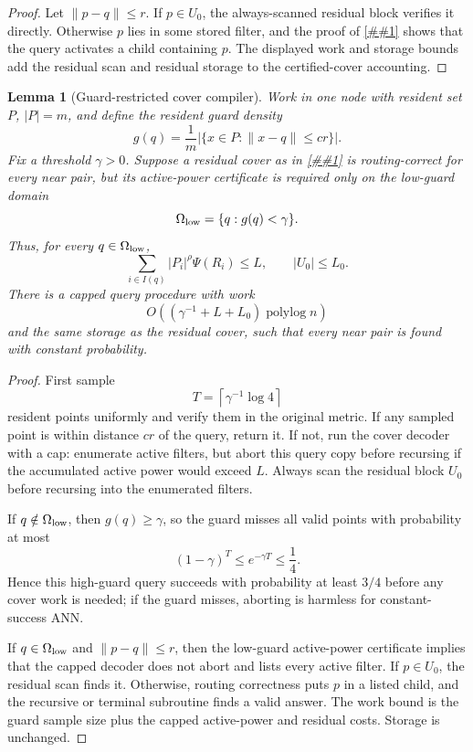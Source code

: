 \documentclass[10pt]{article}
\newcommand{\cref}[1]{\ref{##1}}
\newtheorem{lemma}[theorem]{Lemma}
\theoremstyle{definition}
\newcommand{\polylog}{\operatorname{polylog}}
\begin{document}
\begin{proof}
   Let $\|p-q\|\le r$.  If $p\in U_0$, the always-scanned residual block
   verifies it directly.  Otherwise $p$ lies in some stored filter, and the
   proof of \cref{lem:certified-cover-compiler} shows that the query activates
   a child containing $p$.  The displayed work and storage bounds add the
   residual scan and residual storage to the certified-cover accounting.
\end{proof}

\begin{lemma}[Guard-restricted cover compiler]\label{lem:guard-restricted-cover}
   Work in one node with resident set $P$, $|P|=m$, and define the resident
   guard density
   \[
      g(q)=\frac1m\bigl|\{x\in P:\|x-q\|\le cr\}\bigr|.
   \]
   Fix a threshold $\gamma>0$.  Suppose a residual cover as in
   \cref{lem:cover-residual-scan} is routing-correct for every near pair, but
   its active-power certificate is required only on the low-guard domain
   \[
      \Omega_{\rm low}=\{q:g(q)<\gamma\}.
   \]
   Thus, for every $q\in\Omega_{\rm low}$,
   \[
      \sum_{i\in I(q)} |P_i|^\rho\Psi(R_i)\le L,
      \qquad |U_0|\le L_0 .
   \]
   There is a capped query procedure with work
   \[
      O((\gamma^{-1}+L+L_0)\polylog n)
   \]
   and the same storage as the residual cover, such that every near pair is
   found with constant probability.
\end{lemma}

\begin{proof}
   First sample
   \[
      T=\left\lceil \gamma^{-1}\log 4\right\rceil
   \]
   resident points uniformly and verify them in the original metric.  If any
   sampled point is within distance $cr$ of the query, return it.  If not, run
   the cover decoder with a cap: enumerate active filters, but abort this query
   copy before recursing if the accumulated active power would exceed $L$.
   Always scan the residual block $U_0$ before recursing into the enumerated
   filters.

   If $q\notin\Omega_{\rm low}$, then $g(q)\ge\gamma$, so the guard misses all
   valid points with probability at most
   \[
      (1-\gamma)^T\le e^{-\gamma T}\le\frac14 .
   \]
   Hence this high-guard query succeeds with probability at least $3/4$ before
   any cover work is needed; if the guard misses, aborting is harmless for
   constant-success ANN.

   If $q\in\Omega_{\rm low}$ and $\|p-q\|\le r$, then the low-guard
   active-power certificate implies that the capped decoder does not abort and
   lists every active filter.  If $p\in U_0$, the residual scan finds it.
   Otherwise, routing correctness puts $p$ in a listed child, and the recursive
   or terminal subroutine finds a valid answer.  The work bound is the guard
   sample size plus the capped active-power and residual costs.  Storage is
   unchanged.
\end{proof}
\end{document}
